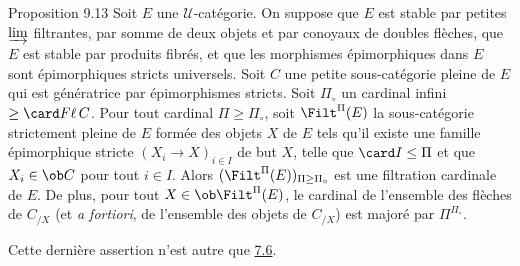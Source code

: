 \begin{enonce*}{Proposition 9.13}
Soit $E$ une $𝒰$-catégorie. On suppose que $E$ est stable
par petites $\varinjlim$ filtrantes, par somme de deux objets et par
conoyaux de doubles flèches, que $E$ est stable par produits fibrés,
et que les morphismes épimorphiques dans $E$ sont épimorphiques
stricts universels. Soit $C$ une petite sous-catégorie pleine de $E$
qui est génératrice par épimorphismes stricts. Soit $\Pi_\circ$ un
cardinal infini $\geq \card F\ell\,  C$. Pour tout cardinal $\Pi\geq
\Pi_\circ$, soit $\Filt^{\Pi}(E)$ la sous-catégorie strictement
pleine de $E$ formée des objets $X$ de $E$ tels qu'il existe une
famille épimorphique stricte $(X_i\rightarrow X)_{i \in I}$ de but
$X$, telle que $\card I\leq \Pi$ et que $X_i\in \ob C$ pour tout
$i\in I$. Alors $(\Filt^{\Pi}(E))_{\Pi\geq \Pi_\circ}$ est une
filtration cardinale de $E$. De plus, pour tout $X\in \ob
\Filt^{\Pi}(E)$, le cardinal de l'ensemble des flèches de $C_{/X}$
(et \textit{a fortiori}, de l'ensemble des objets de $C_{/X}$) est
majoré par $\Pi^{\Pi_\circ}$.
\end{enonce*}

Cette dernière assertion n'est autre que \hyperref[I.prop7.6]{7.6}.

